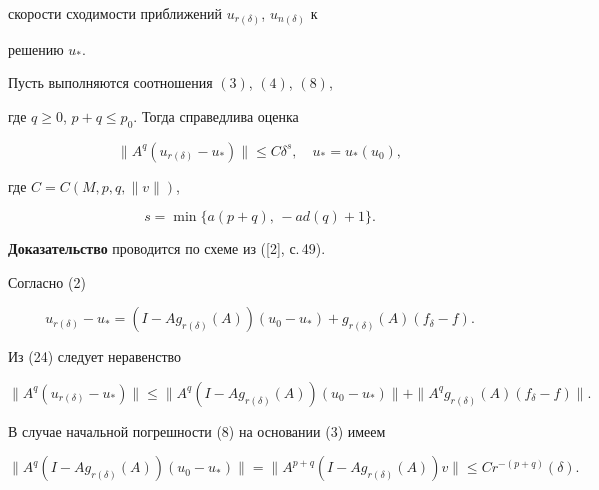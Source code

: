 скорости сходимости приближений $u_{r(\delta)}$, $u_{n(\delta)}$ к 


решению $u_*$. 


 


\begin{prop} 


Пусть выполняются соотношения $(3)$, $(4)$, $(8)$, 


где $q\ge0$, $p+q\le p_0$. Тогда справедлива оценка 


\begin{equation} 


\|A^q(u_{r(\delta)}-u_*)\|\le C\delta^s,\quad 


u_*=u_*(u_0), 


\end{equation} 


где $C=C(M,p,q,\|v\|)$, 


\begin{equation} 


s=\min\{a(p+q),\, -a d(q)+1\}. 


\end{equation} 


\end{prop} 


 


{\bf Доказательство} проводится по схеме из ([2], с.\,49). 


Согласно (2) 


\begin{equation} 


u_{r(\delta)}-u_*=(I-A g_{r(\delta)}(A)) 


(u_0-u_*)+g_{r(\delta)}(A)(f_\delta-f). 


\end{equation} 


Из (24) следует неравенство 


\begin{equation} 


\|A^q(u_{r(\delta)}-u_*)\|\le 


\|A^q(I-A g_{r(\delta)}(A))(u_0-u_*)\|+ 


\|A^q g_{r(\delta)}(A)(f_\delta-f)\|. 


\end{equation} 


В случае начальной погрешности (8) на основании (3) имеем 


\begin{equation} 


\|A^q(I-A g_{r(\delta)}(A))(u_0-u_*)\|= 


\|A^{p+q}(I-A g_{r(\delta)}(A))v\|\le 


C r^{-(p+q)}(\delta). 


\end{equation} 


